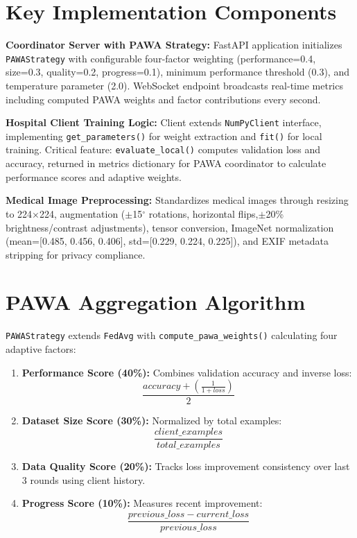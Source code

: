 \section{Key Implementation Components}

\textbf{Coordinator Server with PAWA Strategy:} FastAPI application initializes \texttt{PAWAStrategy} with configurable four-factor weighting (performance=0.4, size=0.3, quality=0.2, progress=0.1), minimum performance threshold (0.3), and temperature parameter (2.0). WebSocket endpoint broadcasts real-time metrics including computed PAWA weights and factor contributions every second.

\textbf{Hospital Client Training Logic:} Client extends \texttt{NumPyClient} interface, implementing \texttt{get\_parameters()} for weight extraction and \texttt{fit()} for local training. Critical feature: \texttt{evaluate\_local()} computes validation loss and accuracy, returned in metrics dictionary for PAWA coordinator to calculate performance scores and adaptive weights.

\textbf{Medical Image Preprocessing:} Standardizes medical images through resizing to 224$\times$224, augmentation ($\pm$15$^\circ$ rotations, horizontal flips,$\pm$20\% brightness/contrast adjustments), tensor conversion, ImageNet normalization (mean=[0.485, 0.456, 0.406], std=[0.229, 0.224, 0.225]), and EXIF metadata stripping for privacy compliance.

\section{PAWA Aggregation Algorithm}

\texttt{PAWAStrategy} extends \texttt{FedAvg} with \texttt{compute\_pawa\_weights()} calculating four adaptive factors:

\begin{enumerate}
    \item \textbf{Performance Score (40\%):} Combines validation accuracy and inverse loss:
    \[ \frac{accuracy + \left( \frac{1}{1 + loss} \right)}{2} \]
    \item \textbf{Dataset Size Score (30\%):} Normalized by total examples:
    \[ \frac{client\_examples}{total\_examples} \]
    \item \textbf{Data Quality Score (20\%):} Tracks loss improvement consistency over last 3 rounds using client history.
    \item \textbf{Progress Score (10\%):} Measures recent improvement:
    \[ \frac{previous\_loss - current\_loss}{previous\_loss} \]
\end{enumerate}

